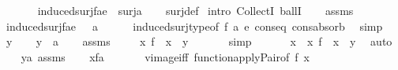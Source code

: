 \begin{isabellebody}
\ \ \isanewline
\ \ \ \ {\isachardoublequoteopen}induced{\isacharunderscore}{\kern0pt}surj{\isacharparenleft}{\kern0pt}f{\isacharcomma}{\kern0pt}a{\isacharcomma}{\kern0pt}e{\isacharparenright}{\kern0pt}\ {\isasymin}\ surj{\isacharparenleft}{\kern0pt}{\isasymalpha}{\isacharcomma}{\kern0pt}a{\isacharparenright}{\kern0pt}{\isachardoublequoteclose}\isanewline
%
\isadelimproof
\ \ %
\endisadelimproof
%
\isatagproof
{}\isamarkupfalse%
\ surj{\isacharunderscore}{\kern0pt}def\isanewline
{}\isamarkupfalse%
\ {\isacharparenleft}{\kern0pt}intro\ CollectI\ ballI{\isacharparenright}{\kern0pt}\isanewline
\ \ \isamarkupfalse%
\ assms\ \isanewline
\ \ \isamarkupfalse%
\ {\isachardoublequoteopen}induced{\isacharunderscore}{\kern0pt}surj{\isacharparenleft}{\kern0pt}f{\isacharcomma}{\kern0pt}a{\isacharcomma}{\kern0pt}e{\isacharparenright}{\kern0pt}{\isacharcolon}{\kern0pt}\ {\isasymalpha}\ {\isasymrightarrow}\ a{\isachardoublequoteclose}\isanewline
\ \ \ \ \isamarkupfalse%
\ induced{\isacharunderscore}{\kern0pt}surj{\isacharunderscore}{\kern0pt}type{\isacharbrackleft}{\kern0pt}of\ f\ a\ e{\isacharbrackright}{\kern0pt}\ cons{\isacharunderscore}{\kern0pt}eq\ cons{\isacharunderscore}{\kern0pt}absorb\ \isamarkupfalse%
\ simp\isanewline
\ \ \isamarkupfalse%
\ y\isanewline
\ \ \isamarkupfalse%
\ {\isachardoublequoteopen}y\ {\isasymin}\ a{\isachardoublequoteclose}\isanewline
\ \ \isamarkupfalse%
\ assms\ \isanewline
\ \ \isamarkupfalse%
\ {\isachardoublequoteopen}{\isasymexists}x{\isasymin}{\isasymalpha}{\isachardot}{\kern0pt}\ f\ {\isacharbackquote}{\kern0pt}\ x\ {\isacharequal}{\kern0pt}\ y{\isachardoublequoteclose}\ \isanewline
\ \ \ \ \isamarkupfalse%
\ simp\isanewline
\ \ \isamarkupfalse%
\isanewline
\ \ \isamarkupfalse%
\ x\ \ {\isachardoublequoteopen}x{\isasymin}{\isasymalpha}{\isachardoublequoteclose}\ {\isachardoublequoteopen}f\ {\isacharbackquote}{\kern0pt}\ x\ {\isacharequal}{\kern0pt}\ y{\isachardoublequoteclose}\ \isamarkupfalse%
\ auto\isanewline
\ \ \isamarkupfalse%
\ {\isacartoucheopen}y{\isasymin}a{\isacartoucheclose}\ assms\isanewline
\ \ \isamarkupfalse%
\ {\isachardoublequoteopen}x{\isasymin}f{\isacharminus}{\kern0pt}{\isacharbackquote}{\kern0pt}{\isacharbackquote}{\kern0pt}a{\isachardoublequoteclose}\ \isanewline
\ \ \ \ \isamarkupfalse%
\ vimage{\isacharunderscore}{\kern0pt}iff\ function{\isacharunderscore}{\kern0pt}apply{\isacharunderscore}{\kern0pt}Pair{\isacharbrackleft}{\kern0pt}of\ f\ x{\isacharbrackright}{\kern0pt}\ \isamarkupfalse%

\end{isabellebody}
